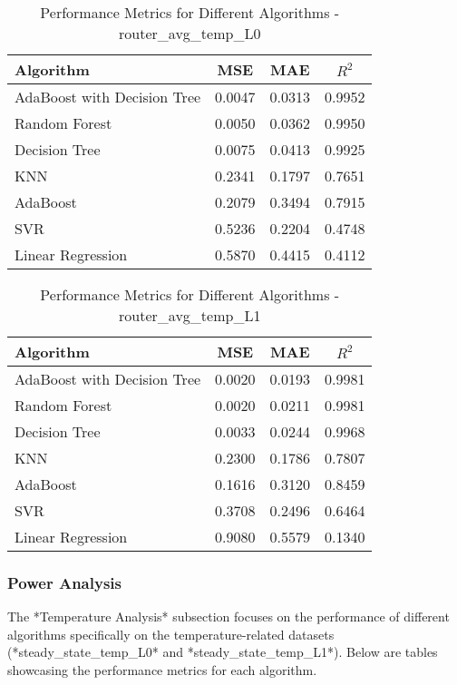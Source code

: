 \documentclass[conference]{IEEEtran}
\begin{document}
\begin{table}[ht]
	\centering
	\caption{Performance Metrics for Different Algorithms - router\_avg\_temp\_L0}
	\label{tab:router_avg_temp_L0}
	\begin{tabular}{lccc}
		\toprule
		\textbf{Algorithm} & \textbf{MSE} & \textbf{MAE} & \textbf{\(R^2\)} \\
		\midrule
		AdaBoost with Decision Tree & 0.0047 & 0.0313 & 0.9952 \\
		Random Forest & 0.0050 & 0.0362 & 0.9950 \\
		Decision Tree & 0.0075 & 0.0413 & 0.9925 \\
		KNN & 0.2341 & 0.1797 & 0.7651 \\
		AdaBoost & 0.2079 & 0.3494 & 0.7915 \\
		SVR & 0.5236 & 0.2204 & 0.4748 \\
		Linear Regression & 0.5870 & 0.4415 & 0.4112 \\
		\bottomrule
	\end{tabular}
\end{table}


\begin{table}[ht]
	\centering
	\caption{Performance Metrics for Different Algorithms - router\_avg\_temp\_L1}
	\label{tab:router_avg_temp_L1}
	\begin{tabular}{lccc}
		\toprule
		\textbf{Algorithm} & \textbf{MSE} & \textbf{MAE} & \textbf{\(R^2\)} \\
		\midrule
		AdaBoost with Decision Tree & 0.0020 & 0.0193 & 0.9981 \\
		Random Forest & 0.0020 & 0.0211 & 0.9981 \\
		Decision Tree & 0.0033 & 0.0244 & 0.9968 \\
		KNN & 0.2300 & 0.1786 & 0.7807 \\
		AdaBoost & 0.1616 & 0.3120 & 0.8459 \\
		SVR & 0.3708 & 0.2496 & 0.6464 \\
		Linear Regression & 0.9080 & 0.5579 & 0.1340 \\
		\bottomrule
	\end{tabular}
\end{table}

	
	
\subsubsection{Power Analysis}
The *Temperature Analysis* subsection focuses on the performance of different algorithms specifically on the temperature-related datasets (*steady\_state\_temp\_L0* and *steady\_state\_temp\_L1*). Below are tables showcasing the performance metrics for each algorithm.
\end{document}
